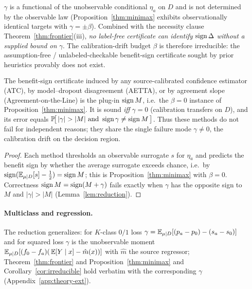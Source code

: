 \begin{corollary}\label{cor:irreducible}
$\gamma$ is a functional of the unobservable conditional $\eta_a$ on $D$ and is not
determined by the observable law (Proposition~\ref{thm:minimax} exhibits observationally
identical targets with $\gamma=\pm\beta$). Combined with the necessity clause
Theorem~\ref{thm:frontier}(iii), \emph{no label-free certificate can identify $\operatorname{sign}\Delta$
without a supplied bound on $\gamma$}. The calibration-drift budget $\beta$ is therefore
irreducible: the assumption-free / unlabeled-checkable benefit-sign certificate sought by
prior heuristics provably does not exist.
\end{corollary}

\begin{proposition}[The heuristics are the $\beta{=}0$ face]\label{prop:beta0}
The benefit-sign certificate induced by any source-calibrated confidence estimator (ATC),
by model--dropout disagreement (AETTA), or by agreement slope (Agreement-on-the-Line) is
the plug-in $\operatorname{sign} M$, i.e.\ the $\beta{=}0$ instance of Proposition~\ref{thm:minimax}. It is
sound \emph{iff} $\gamma=0$ (calibration transfers on $D$), and its error equals
$\Pr\!\big[\,|\gamma|>|M|\ \text{and}\ \sign\gamma\neq\sign M\,\big]$. Thus these methods do
not fail for independent reasons; they share the single failure mode $\gamma\neq0$, the
calibration drift on the decision region.
\end{proposition}
\begin{proof}
Each method thresholds an observable surrogate $s$ for $\eta_a$ and predicts the benefit
sign by whether the average surrogate exceeds chance, i.e.\ by $\operatorname{sign}(\mathbb{E}_{\mu\mid D}[s]-\tfrac12)=\operatorname{sign} M$;
this is Proposition~\ref{thm:minimax} with $\beta=0$. Correctness $\operatorname{sign} M=\operatorname{sign}(M+\gamma)$ fails
exactly when $\gamma$ has the opposite sign to $M$ and $|\gamma|>|M|$ (Lemma~\ref{lem:reduction}).
\end{proof}

\paragraph{Multiclass and regression.} The reduction generalizes: for $K$-class $0/1$ loss
$\gamma=\mathbb{E}_{\mu\mid D}[(p_a-p_0)-(s_a-s_0)]$ and for squared loss $\gamma$ is the
unobservable moment $\mathbb{E}_{\mu\mid D}[(f_0-f_a)(\,\mathbb{E}[Y\mid x]-\hat m(x))]$ with $\hat m$ the
source regressor; Theorem~\ref{thm:frontier} and Proposition~\ref{thm:minimax} and
Corollary~\ref{cor:irreducible} hold verbatim with the corresponding $\gamma$
(Appendix~\ref{app:theory-ext}).

